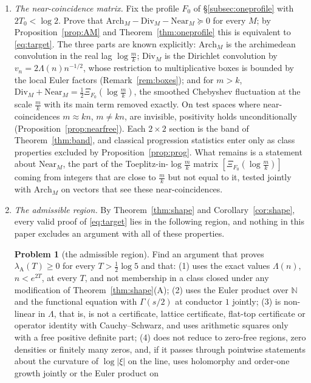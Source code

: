 \documentclass[11pt]{amsart}
\theoremstyle{definition}
\newtheorem{problem}[theorem]{Problem}
\theoremstyle{remark}
\newcommand{\N}{\mathbb N}
\newcommand{\lamA}{\lambda_{\mathrm A}(T)}
\begin{document}
\begin{enumerate}
\item[(S)] \emph{The near-coincidence matrix.} Fix the profile $F_0$ of \S\ref{subsec:oneprofile} with $2T_0<\log2$. Prove that
$\mathrm{Arch}_M-\mathrm{Div}_M-\mathrm{Near}_M\succeq0$ for every $M$; by Proposition~\ref{prop:AM} and Theorem~\ref{thm:oneprofile}
this is equivalent to \eqref{eq:target}. The three parts are known explicitly: $\mathrm{Arch}_M$ is the archimedean convolution
in the real lag $\log\frac mk$; $\mathrm{Div}_M$ is the Dirichlet convolution by $v_n=2\Lambda(n)n^{-1/2}$, whose restriction to
multiplicative boxes is bounded by the local Euler factors (Remark~\ref{rem:boxes}); and for $m>k$,
$\mathrm{Div}_M+\mathrm{Near}_M=\frac12\Xi_{F_0}(\log\frac mk)$, the smoothed Chebyshev fluctuation at the scale $\frac mk$ with its
main term removed exactly. On test spaces where near-coincidences $m\approx kn$, $m\ne kn$, are invisible, positivity holds
unconditionally (Proposition~\ref{prop:nearfree}). Each $2\times2$ section is the band of Theorem~\ref{thm:band}, and classical
progression statistics enter only as class properties excluded by Proposition~\ref{prop:prog}. What remains is a statement about
$\mathrm{Near}_M$, the part of the Toeplitz-in-$\log\frac mk$ matrix $[\Xi_{F_0}(\log\frac mk)]$ coming from integers that are close
to $\frac mk$ but not equal to it, tested jointly with $\mathrm{Arch}_M$ on vectors that see these near-coincidences.
\item[(R)] \emph{The admissible region.} By Theorem~\ref{thm:shape} and Corollary~\ref{cor:shape}, every valid proof of
\eqref{eq:target} lies in the following region, and nothing in this paper excludes an argument with all of these properties.
\begin{problem}[the admissible region]\label{prob:region}
Find an argument that proves $\lamA\ge0$ for every $T>\frac12\log5$ and that: (1) uses the exact values $\Lambda(n)$, $n<e^{2T}$,
at every $T$, and not membership in a class closed under any modification of Theorem~\ref{thm:shape}(A); (2) uses the Euler product
over $\N$ and the functional equation with $\Gamma(s/2)$ at conductor $1$ jointly; (3) is non-linear in $\Lambda$, that is, is not a
certificate, lattice certificate, flat-top certificate or operator identity with Cauchy--Schwarz, and uses arithmetic squares only with a
free positive definite part; (4) does not reduce to zero-free regions, zero densities or finitely many zeros, and, if it passes through
pointwise statements about the curvature of $\log|\xi|$ on the line, uses holomorphy and order-one growth jointly or the Euler product on

\end{problem}
\end{enumerate}
\end{document}
